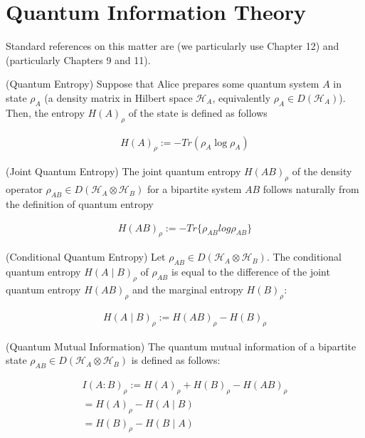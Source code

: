 \documentclass[main.tex]{subfiles}
\begin{document}
\section{Quantum Information Theory}

Standard references on this matter are \cite{nielsen2010quantum} (we particularly use Chapter 12) and \cite{wilde2013quantum} (particularly Chapters 9 and 11).


\begin{definition}(Quantum Entropy)
Suppose that Alice prepares some quantum system $A$ in state $\rho_A$ (a density matrix in Hilbert space $\mathcal{H}_A$, equivalently $\rho_A \in D(\mathcal{H}_A)$). Then, the entropy $H(A)_\rho$  of the state is defined as follows

\begin{align}
	H(A)_\rho := -Tr(\rho_A \log \rho_A)
\end{align}
\end{definition}

\begin{definition}(Joint Quantum Entropy)
The joint quantum entropy $H(AB)_\rho$ of the density operator $\rho_{AB} \in D(\mathcal{H}_A \otimes \mathcal{H}_B)$ for a bipartite system $AB$ follows naturally from the definition of quantum entropy

\begin{align}
H(AB)_\rho := −Tr\{\rho_{AB}log \rho_{AB}\}
\end{align}
\end{definition}


\begin{definition}(Conditional Quantum Entropy)
Let $\rho_{AB} \in D(\mathcal{H}_A\otimes \mathcal{H}_B)$. The conditional quantum entropy $H(A\mid B)_\rho$ of $\rho_{AB}$ is equal to the difference of the joint quantum entropy $H(AB)_\rho$ and the marginal entropy $H(B)_\rho$:


\begin{align}
H(A\mid B)_\rho := H(AB)_\rho - H(B)_\rho
\end{align}
\end{definition}

\begin{definition}
(Quantum Mutual Information) The quantum mutual information of a bipartite state $\rho_{AB} \in D(\mathcal{H}_A\otimes \mathcal{H}_B)$ is defined as follows:

\begin{align}
I(A: B)_\rho := H(A)_\rho + H(B)_\rho - H(AB)_\rho \\
= H(A)_\rho - H(A\mid B) \\
= H(B)_\rho - H(B \mid A)
\end{align}

\end{definition}
\end{document}
